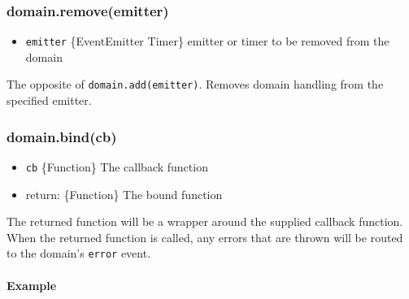\subsubsection{domain.remove(emitter)}

\begin{itemize}
\item
  \texttt{emitter} \{EventEmitter \textbar{} Timer\} emitter or timer to
  be removed from the domain
\end{itemize}

The opposite of \texttt{domain.add(emitter)}. Removes domain handling
from the specified emitter.

\subsubsection{domain.bind(cb)}

\begin{itemize}
\item
  \texttt{cb} \{Function\} The callback function
\item
  return: \{Function\} The bound function
\end{itemize}

The returned function will be a wrapper around the supplied callback
function. When the returned function is called, any errors that are
thrown will be routed to the domain's \texttt{error} event.

\paragraph{Example}

\begin{Shaded}
\begin{Highlighting}[]
 \NormalTok{();}

 
  \NormalTok{, }\NormalTok{(}
     
  \NormalTok{\}));}
\NormalTok{\}}

\NormalTok{(}\NormalTok{, }
\NormalTok{\});}
\end{Highlighting}
\end{Shaded}

